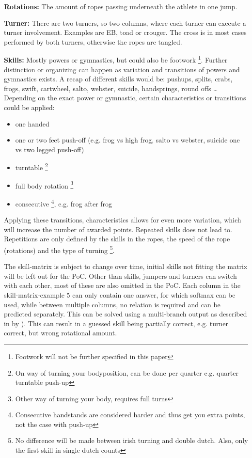\textbf{Rotations:} The amount of ropes passing underneath the athlete in one jump.

\textbf{Turner:} There are two turners, so two columns, where each turner can execute a turner involvement. Examples are EB, toad or crouger. The cross is in most cases performed by both turners, otherwise the ropes are tangled.

\textbf{Skills:} Mostly powers or gymnastics, but could also be footwork \footnote{Footwork will not be further specified in this paper}. Further distinction or organizing can happen as variation and transitions of powers and gymnastics exists. A recap of different skills would be: pushups, splits, crabs, frogs, swift, cartwheel, salto, webster, suicide, handsprings, round offs \dots %
Depending on the exact power or gymnastic, certain characteristics or transitions could be applied:

\begin{itemize}
    \item one handed
    \item one or two feet push-off (e.g. frog vs high frog, salto vs webster, suicide one vs two legged push-off)
    \item turntable \footnote{On way of turning your bodyposition, can be done per quarter e.g. quarter turntable push-up}
    \item full body rotation \footnote{Other way of turning your body, requires full turns}
    \item consecutive \footnote{Consecutive handstands are considered harder and thus get you extra points, not the case with push-up}, e.g. frog after frog
\end{itemize}

Applying these transitions, characteristics allows for even more variation, which will increase the number of awarded points. Repeated skills does not lead to. Repetitions are only defined by the skills in the ropes, the speed of the rope (rotations) and the type of turning \footnote{No difference will be made between irish turning and double dutch. Also, only the first skill in single dutch counts}.

\medskip

The skill-matrix is subject to change over time, initial skills not fitting the matrix will be left out for the PoC. Other than skills, jumpers and turners can switch with each other, most of these are also omitted in the PoC.
Each column in the skill-matrix-example 5 can only contain one answer, for which softmax can be used, while between multiple columns, no relation is required and can be predicted separately. This can be solved using a multi-branch output as described in by \autocite{Coulibaly_2022}). This can result in a guessed skill being partially correct, e.g. turner correct, but wrong rotational amount.

